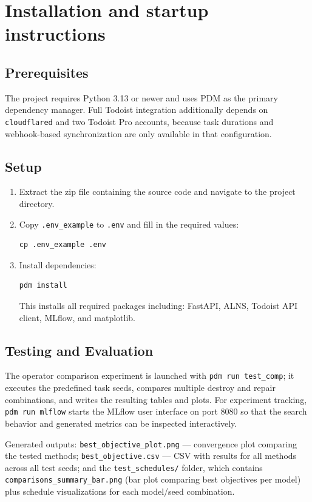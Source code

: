 \documentclass{article}
\begin{document}
\section{Installation and startup instructions}

\subsection{Prerequisites}
The project requires Python 3.13 or newer and uses PDM as the primary dependency manager. Full Todoist integration additionally depends on \texttt{cloudflared} and two Todoist Pro accounts, because task durations and webhook-based synchronization are only available in that configuration.

\subsection{Setup}
\begin{enumerate}
\item Extract the zip file containing the source code and navigate to the project directory.
\item Copy \texttt{.env\_example} to \texttt{.env} and fill in the required values:
\begin{verbatim}
cp .env_example .env
\end{verbatim}
\item Install dependencies:
\begin{verbatim}
pdm install
\end{verbatim}
This installs all required packages including: FastAPI, ALNS, Todoist API client, MLflow, and matplotlib.
\end{enumerate}

\subsection{Testing and Evaluation}
The operator comparison experiment is launched with \texttt{pdm run test\_comp}; it executes the predefined task seeds, compares multiple destroy and repair combinations, and writes the resulting tables and plots. For experiment tracking, \texttt{pdm run mlflow} starts the MLflow user interface on port 8080 so that the search behavior and generated metrics can be inspected interactively.

Generated outputs: \texttt{best\_objective\_plot.png} — convergence plot comparing the tested methods; \texttt{best\_objective.csv} — CSV with results for all methods across all test seeds; and the \texttt{test\_schedules/} folder, which contains \texttt{comparisons\_summary\_bar.png} (bar plot comparing best objectives per model) plus schedule visualizations for each model/seed combination.
\end{document}
